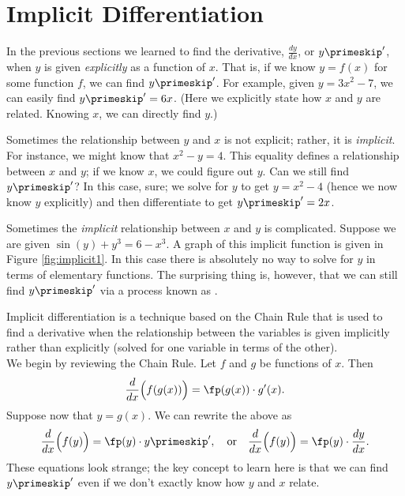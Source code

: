 \section{Implicit Differentiation}\label{sec:imp_deriv}

In the previous sections we learned to find the derivative, $ \frac{dy}{dx}$, or $y\primeskip'$, when $y$ is given \textit{explicitly} as a function of $x$. That is, if we know $y=f(x)$ for some function $f$, we can find $y\primeskip'$. For example, given  $y=3x^2-7$, we can easily find $y\primeskip'=6x$. (Here we explicitly state how $x$ and $y$ are related. Knowing $x$, we can directly find $y$.)

Sometimes the relationship between $y$ and $x$ is not explicit; rather, it is \textit{implicit}. For instance, we might know that $x^2-y=4$. This equality defines a relationship between $x$ and $y$; if we know $x$, we could figure out $y$. Can we still find $y\primeskip'$?  In this case, sure; we  solve for $y$ to get $y=x^2-4$ (hence we now know $y$ explicitly)  and then differentiate to get $y\primeskip'=2x$.

Sometimes the \textit{implicit} relationship between $x$ and $y$ is complicated.  Suppose we are given $\sin(y)+y^3=6-x^3$. A graph of this implicit function is given in Figure \ref{fig:implicit1}. In this case there is absolutely no way to solve for $y$ in terms of elementary functions.  The surprising thing is, however, that we can still find $y\primeskip'$ via a process known as .


Implicit differentiation is a technique based on the Chain Rule that is used to find a derivative when the relationship between the variables is given implicitly rather than explicitly (solved for one variable in terms of the other). \\

We begin by reviewing the Chain Rule. Let $f$ and $g$ be functions of $x$. Then $$\frac{d}{dx}\Big(f(g(x))\Big) = \fp(g(x))\cdot g'(x).$$ Suppose now that $y=g(x)$. We can rewrite the above as
\begin{equation}
\frac{d}{dx}\Big(f(y)\Big) = \fp(y)\cdot y\primeskip', \quad \text{or}\quad
\frac{d}{dx}\Big(f(y)\Big) = \fp(y)\cdot \frac{dy}{dx} .\label{eq:implicit1}
\end{equation}
These equations look strange; the key concept to learn here is that we can find $y\primeskip'$ even if we don't exactly know how $y$ and $x$ relate.\\

